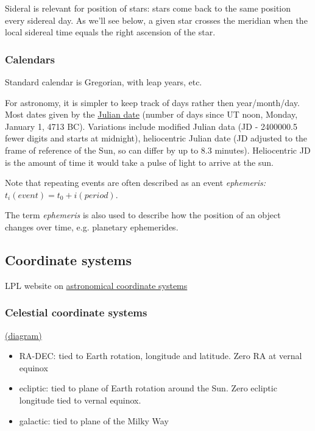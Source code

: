 \documentclass[12pt]{article}
\begin{document}
Sideral is relevant for position of stars: stars come back
to the same position every sidereal day. As we'll see
below, a given star crosses the meridian when the
local sidereal time equals the right ascension of the
star.

\subsubsection*{Calendars}

Standard calendar is Gregorian, with leap years, etc.

For astronomy, it is simpler to keep track of days rather
    then year/month/day. Most dates given by the
    \url{Julian date} (number of days since UT noon, Monday,
    January 1, 4713 BC). Variations include modified Julian
    data (JD - 2400000.5 fewer digits and starts at midnight),
    heliocentric Julian date (JD adjusted to the frame of
    reference of the Sun, so can differ by up to 8.3 minutes).
    Heliocentric JD is the amount of time it would take a
    pulse of light to arrive at the sun.

Note that repeating events are often described as an event
    \emph{ephemeris:} $t_i(event) = t_0 + i(period)$.

The term \emph{ephemeris} is also used to describe how the
    position of an object changes over time, e.g. planetary
    ephemerides.

\subsection*{Coordinate systems}
LPL website on \textcolor{blue}
{\href{http://spider.seds.org/spider/ScholarX/coords.html}
{astronomical coordinate systems}}
\subsubsection*{Celestial coordinate systems}
\textcolor{blue}
{\href{http://csep10.phys.utk.edu/astr161/lect/time/coordinates.html}{(diagram)}}
\begin{itemize}
    \item RA-DEC: tied to Earth rotation, longitude and latitude.
        Zero RA at vernal equinox
    \item ecliptic: tied to plane of Earth rotation around the Sun.
        Zero ecliptic longitude tied to vernal equinox.
    \item galactic: tied to plane of the Milky Way
\end{itemize}
\end{document}

